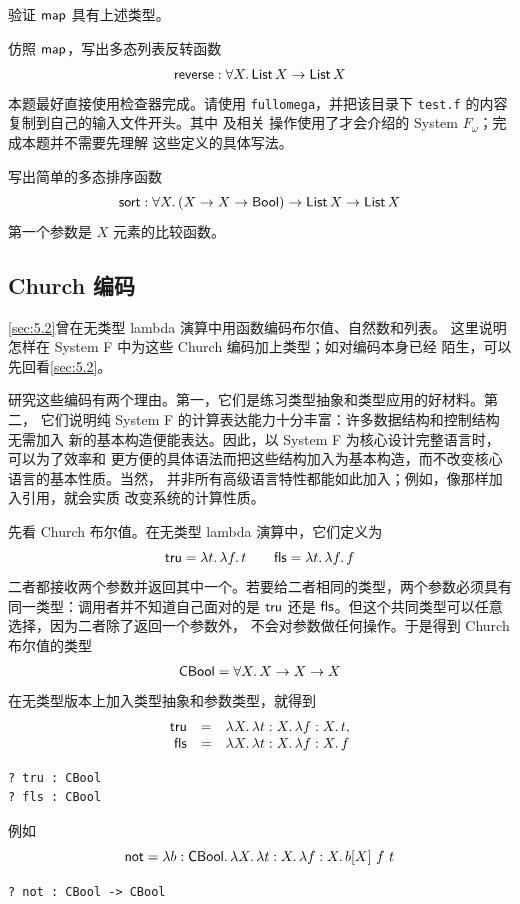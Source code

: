 \begin{exercise}[\(\star\star\)]
\label{ex:23.4.2}
验证 \(\mathsf{map}\) 具有上述类型。
\end{exercise}

\begin{exercise}
\label{ex:23.4.3}
仿照 \(\mathsf{map}\)，写出多态列表反转函数
\[
\mathsf{reverse}:\forall X.\,\mathsf{List}\,X\to\mathsf{List}\,X
\]
本题最好直接使用检查器完成。请使用 \texttt{fullomega}，并把该目录下
\texttt{test.f} 的内容复制到自己的输入文件开头。其中  及相关
操作使用了才会介绍的 System \(F_\omega\)；完成本题并不需要先理解
这些定义的具体写法。
\end{exercise}

\begin{exercise}[\(\star\star\)]
\label{ex:23.4.4}
写出简单的多态排序函数
\[
\mathsf{sort}:\forall X.\,(X\to X\to\mathsf{Bool})\to
\mathsf{List}\,X\to\mathsf{List}\,X
\]
第一个参数是 \(X\) 元素的比较函数。
\end{exercise}

\subsection*{Church 编码}

\cref{sec:5.2}曾在无类型 lambda 演算中用函数编码布尔值、自然数和列表。
这里说明怎样在 System F 中为这些 Church 编码加上类型；如对编码本身已经
陌生，可以先回看\cref{sec:5.2}。

研究这些编码有两个理由。第一，它们是练习类型抽象和类型应用的好材料。第二，
它们说明纯 System F 的计算表达能力十分丰富：许多数据结构和控制结构无需加入
新的基本构造便能表达。因此，以 System F 为核心设计完整语言时，可以为了效率和
更方便的具体语法而把这些结构加入为基本构造，而不改变核心语言的基本性质。当然，
并非所有高级语言特性都能如此加入；例如，像那样加入引用，就会实质
改变系统的计算性质。

先看 Church 布尔值。在无类型 lambda 演算中，它们定义为
\[
\mathsf{tru}=\lambda t.\,\lambda f.\,t
\qquad
\mathsf{fls}=\lambda t.\,\lambda f.\,f
\]
二者都接收两个参数并返回其中一个。若要给二者相同的类型，两个参数必须具有
同一类型：调用者并不知道自己面对的是 \(\mathsf{tru}\) 还是
\(\mathsf{fls}\)。但这个共同类型可以任意选择，因为二者除了返回一个参数外，
不会对参数做任何操作。于是得到 Church 布尔值的类型
\[
\mathsf{CBool}=\forall X.\,X\to X\to X
\]
在无类型版本上加入类型抽象和参数类型，就得到
\[
\begin{array}{rcl}
\mathsf{tru}&=&\lambda X.\,\lambda t:X.\,\lambda f:X.\,t,\\
\mathsf{fls}&=&\lambda X.\,\lambda t:X.\,\lambda f:X.\,f
\end{array}
\]
\begin{lstlisting}
? tru : CBool
? fls : CBool
\end{lstlisting}
例如
\[
\mathsf{not}
=\lambda b:\mathsf{CBool}.\,
 \lambda X.\,\lambda t:X.\,\lambda f:X.\,b[X]\ f\ t
\]
\begin{lstlisting}
? not : CBool -> CBool
\end{lstlisting}

